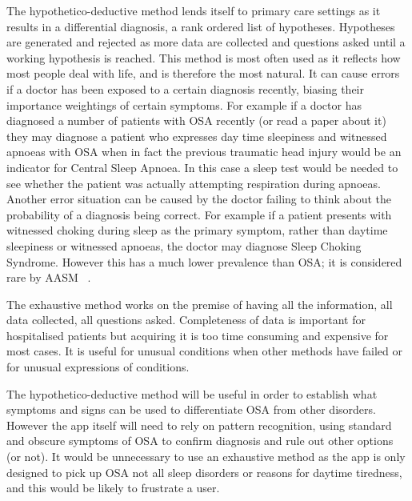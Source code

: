 The hypothetico-deductive method lends itself to primary care settings as it results in a differential diagnosis, a rank ordered list of hypotheses. Hypotheses are generated and rejected as more data are collected and questions asked until a working hypothesis is reached. This method is most often used as it reflects how most people deal with life, and is therefore the most natural. It can cause errors if a doctor has been exposed to a certain diagnosis recently, biasing their importance weightings of certain symptoms. For example if a doctor has diagnosed a number of patients with OSA recently (or read a paper about it) they may diagnose a patient who expresses day time sleepiness and witnessed apnoeas with OSA when in fact the previous traumatic head injury would be an indicator for Central Sleep Apnoea. In this case a sleep test would be needed to see whether the patient was actually attempting respiration during apnoeas. Another error situation can be caused by the doctor failing to think about the probability of a diagnosis being correct. For example if a patient presents with witnessed choking during sleep as the primary symptom, rather than daytime sleepiness or witnessed apnoeas, the doctor may diagnose Sleep Choking Syndrome. However this has a much lower prevalence than OSA; it is considered rare by AASM ~\cite{american2001international}.

The exhaustive method works on the premise of having all the information, all data collected, all questions asked. Completeness of data is important for hospitalised patients but acquiring it is too time consuming and expensive for most cases. It is useful for unusual conditions when other methods have failed or for unusual expressions of conditions. 

The hypothetico-deductive method will be useful in order to establish what symptoms and signs can be used to differentiate OSA from other disorders. However the app itself will need to rely on pattern recognition, using standard and obscure symptoms of OSA to confirm diagnosis and rule out other options (or not). It would be unnecessary to use an exhaustive method as the app is only designed to pick up OSA not all sleep disorders or reasons for daytime tiredness, and this would be likely to frustrate a user.
